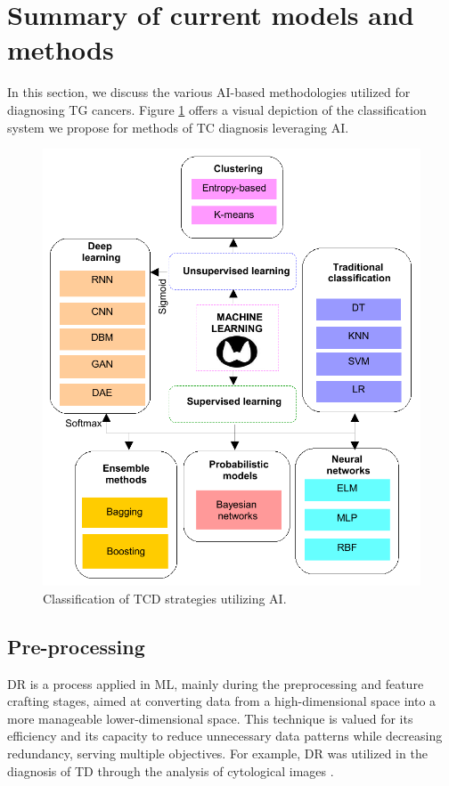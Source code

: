\documentclass[a4paper,fleqn]{cas-sc}
\begin{document}
\section{Summary of current models and methods} \label{sec2}
In this section, we discuss the various AI-based methodologies utilized for diagnosing \ac{TG} cancers. Figure \ref{fig3} offers a visual depiction of the classification system we propose for methods of TC diagnosis leveraging \ac{AI}.

\begin{figure}[t!]
\centering
\includegraphics[scale=0.9]{fig3.pdf}
\caption{Classification of \ac{TCD} strategies utilizing \ac{AI}.} 
\label{fig3}
\end{figure}


\subsection{Pre-processing}
\ac{DR} is a process applied in \ac{ML}, mainly during the preprocessing and feature crafting stages, aimed at converting data from a high-dimensional space into a more manageable lower-dimensional space. This technique is valued for its efficiency and its capacity to reduce unnecessary data patterns while decreasing redundancy, serving multiple objectives. For example, \ac{DR} was utilized in the diagnosis of \ac{TD} through the analysis of cytological images \cite{tarkov2012data}.
\end{document}
